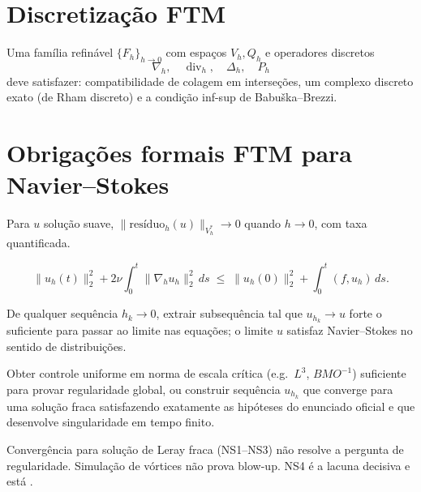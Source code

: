 \documentclass[11pt,a4paper]{article}
\begin{document}
\section{Discretização FTM}

\begin{definition}
Uma família refinável $\{F_h\}_{h\to0}$ com espaços $V_h,Q_h$
e operadores discretos
\[
  \nabla_h,\quad \operatorname{div}_h,\quad \Delta_h,\quad P_h
\]
deve satisfazer: compatibilidade de colagem em interseções,
um complexo discreto exato (de Rham discreto) e
a condição inf-sup de Babuška–Brezzi.
\end{definition}

\section{Obrigações formais FTM para Navier–Stokes}

\begin{obligation}[NS1 — Consistência]\label{ob:NS1}
Para $u$ solução suave,
$\|\text{resíduo}_h(u)\|_{V_h^*}\to0$ quando $h\to0$,
com taxa quantificada.
\end{obligation}

\begin{obligation}\label{ob:NS2}
\[
  \|u_h(t)\|_2^2 + 2\nu\int_0^t\|\nabla_h u_h\|_2^2\,ds
  \;\le\; \|u_h(0)\|_2^2 + \int_0^t(f,u_h)\,ds.
\]
\end{obligation}

\begin{obligation}\label{ob:NS3}
De qualquer sequência $h_k\to0$, extrair subsequência tal que
$u_{h_k}\to u$ forte o suficiente para passar ao limite nas
equações; o limite $u$ satisfaz Navier–Stokes no sentido
de distribuições.
\end{obligation}

\begin{obligation}\label{ob:NS4}
Obter controle uniforme em norma de escala crítica
(e.g.\ $L^3$, $BMO^{-1}$) suficiente para provar regularidade global,
ou construir sequência $u_{h_k}$ que converge para uma solução fraca
satisfazendo exatamente as hipóteses do enunciado oficial e
que desenvolve singularidade em tempo finito.
\end{obligation}

\begin{remark}
Convergência para solução de Leray fraca (NS1–NS3) não resolve
a pergunta de regularidade.
Simulação de vórtices não prova blow-up.
NS4 é a lacuna decisiva e está \OPEN.
\end{remark}

\end{document}
